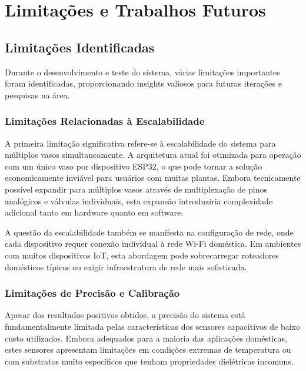 \chapter{Limitações e Trabalhos Futuros}

\section{Limitações Identificadas}

Durante o desenvolvimento e teste do sistema, várias limitações importantes foram identificadas, proporcionando insights valiosos para futuras iterações e pesquisas na área.

\subsection{Limitações Relacionadas à Escalabilidade}

A primeira limitação significativa refere-se à escalabilidade do sistema para múltiplos vasos simultaneamente. A arquitetura atual foi otimizada para operação com um único vaso por dispositivo ESP32, o que pode tornar a solução economicamente inviável para usuários com muitas plantas. Embora tecnicamente possível expandir para múltiplos vasos através de multiplexação de pinos analógicos e válvulas individuais, esta expansão introduziria complexidade adicional tanto em hardware quanto em software.

A questão da escalabilidade também se manifesta na configuração de rede, onde cada dispositivo requer conexão individual à rede Wi-Fi doméstica. Em ambientes com muitos dispositivos IoT, esta abordagem pode sobrecarregar roteadores domésticos típicos ou exigir infraestrutura de rede mais sofisticada.

\subsection{Limitações de Precisão e Calibração}

Apesar dos resultados positivos obtidos, a precisão do sistema está fundamentalmente limitada pelas características dos sensores capacitivos de baixo custo utilizados. Embora adequados para a maioria das aplicações domésticas, estes sensores apresentam limitações em condições extremas de temperatura ou com substratos muito específicos que tenham propriedades dielétricas incomuns.

